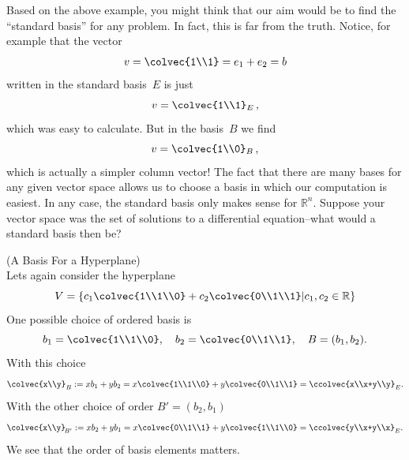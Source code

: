 \begin{example}

\end{example}

Based on the above example, you might think that our aim would be to find the ``standard basis'' for any problem. 
In fact, this is far from the truth. Notice, for example that the vector \[v=\colvec{1\\1}=e_1+e_2=b\] written in the standard basis~$E$ is just
\[
v=\colvec{1\\1}_E\, ,
\]
which was easy to calculate. But in the basis~$B$ we find
\[
v=\colvec{1\\0}_B\, ,
\]
which is actually a simpler column vector!
The fact that there are many bases for any given vector space allows us to choose a basis in which our computation is easiest. 
In any case, the standard basis only makes sense for $\mathbb{R}^n$. Suppose your vector space was the set of solutions to a differential equation--what would a standard basis then be?



\begin{example} (A Basis For a Hyperplane)\\
Lets again consider the hyperplane
\[
V=\left\{  c_1\colvec{1\\1\\0} +c_2\colvec{0\\1\\1} \middle| c_1,c_2\in \mathbb{R} \right\} 
\]
One possible choice of ordered basis is 
\[b_1=\colvec{1\\1\\0},~~~b_2=\colvec{0\\1\\1}, ~~~
B=(b_1,b_2).
\]
With this choice
\[
\colvec{x\\y}_B := xb_1+ y b_2 
=x\colvec{1\\1\\0}+y \colvec{0\\1\\1}=\ccolvec{x\\x+y\\y}_E.
\]
With the other choice of order $B'=(b_2, b_1)$ 
\[
\colvec{x\\y}_{\!B'} := xb_2+ y b_1 
=x\colvec{0\\1\\1}+y \colvec{1\\1\\0}=\ccolvec{y\\x+y\\x}_E.
\]
We see that the  order of basis elements matters. 
\end{example}

